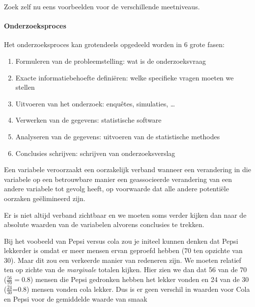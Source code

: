 \begin{exercise}
	Zoek zelf nu eens voorbeelden voor de verschillende meetniveaus.
\end{exercise}

\paragraph{Onderzoeksproces}
Het onderzoeksproces kan grotendeels opgedeeld worden in 6 grote fasen:
\begin{enumerate}
	\item Formuleren van de probleemstelling: wat is de onderzoeksvraag
	\item Exacte informatiebehoefte defini\"eren: welke specifieke vragen moeten we stellen
	\item Uitvoeren van het onderzoek: enqu\^etes, simulaties, \dots
	\item Verwerken van de gegevens: statistische software
	\item Analyseren van de gegevens: uitvoeren van de statistische methodes
	\item Conclusies schrijven: schrijven van onderzoeksverslag
\end{enumerate}

\begin{definition}
 Een variabele veroorzaakt een oorzakelijk verband wanneer een verandering in die variabele op een betrouwbare manier een geassocieerde verandering van een andere variabele tot gevolg heeft, op voorwaarde dat alle andere potenti\"ele oorzaken ge\"elimineerd zijn.
\end{definition}

Er is niet altijd verband zichtbaar en we moeten soms verder kijken dan naar de absolute waarden van de variabelen alvorens conclusies te trekken.

\begin{example}
	Bij het voobeeld van Pepsi versus cola zou je initeel kunnen denken dat Pepsi lekkerder is omdat er meer mensen ervan geproefd hebben (70 ten opzichte van 30). Maar dit zou een verkeerde manier van redeneren zijn. We moeten relatief ten op zichte van de  \textit{marginale} totalen kijken. Hier zien we dan dat 56 van de 70 ($\frac{56}{70} = 0.8$) mensen die Pepsi gedronken hebben het lekker vonden en 24 van de 30 ($\frac{24}{30}$=0.8) mensen vonden cola lekker. Dus is er geen verschil in waarden voor Cola en Pepsi voor de gemiddelde waarde van smaak
\end{example}

